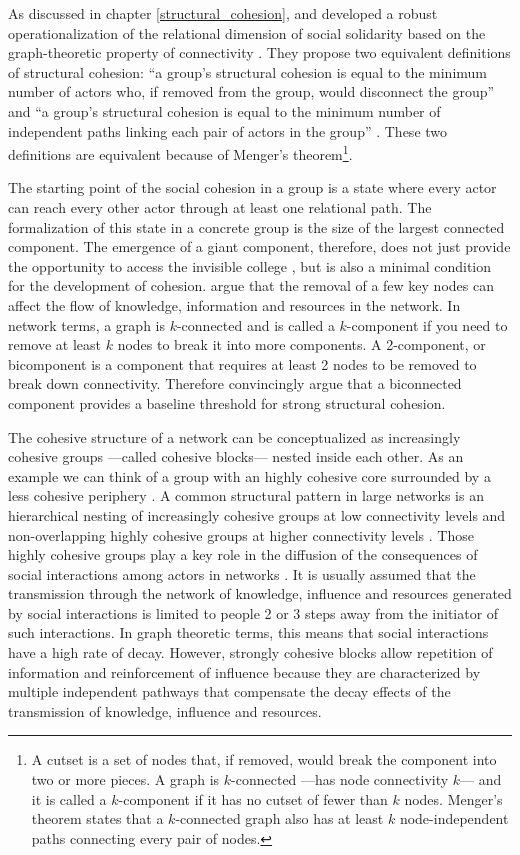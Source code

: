 As discussed in chapter \ref{structural_cohesion}, \citet{white:2001} and \citet{moody:2003} developed a robust operationalization of the relational dimension of social solidarity based on the graph-theoretic property of connectivity \citep{harary:1969}. They propose two equivalent definitions of structural cohesion: ``a group's structural cohesion is equal to the minimum number of actors who, if removed from the group, would disconnect the group'' and ``a group's structural cohesion is equal to the minimum number of independent paths linking each pair of actors in the group'' \citep[109]{moody:2003}. These two definitions are equivalent because of Menger's theorem\footnote{A cutset is a set of nodes that, if removed, would break the component into two or more pieces. A graph is $k$-connected ---has node connectivity $k$--- and it is called a $k$-component if it has no cutset of fewer than $k$ nodes. Menger's theorem states that a $k$-connected graph also has at least $k$ node-independent paths connecting every pair of nodes.}.

The starting point of the social cohesion in a group is a state where every actor can reach every other actor through at least one relational path. The formalization of this state in a concrete group is the size of the largest connected component. The emergence of a giant component, therefore, does not just provide the opportunity to access the invisible college \citep{guimera:2005}, but is also a minimal condition for the development of cohesion. \citet{moody:2003} argue that the removal of a few key nodes can affect the flow of knowledge, information and resources in the network. In network terms, a graph is $k$-connected and is called a $k$-component if you need to remove at least $k$ nodes to break it into more components. A 2-component, or bicomponent is a component that requires at least 2 nodes to be removed to break down connectivity.  Therefore \citet{moody:2003} convincingly argue that a biconnected component provides a baseline threshold for strong structural cohesion.

The cohesive structure of a network can be conceptualized as increasingly cohesive groups ---called cohesive blocks--- nested inside each other. As an example we can think of a group with an highly cohesive core surrounded by a less cohesive periphery \citep{borgatti:2000}. A common structural pattern in large networks is an hierarchical nesting of increasingly cohesive groups at low connectivity levels and non-overlapping highly cohesive groups at higher connectivity levels \citep[112]{moody:2003}. Those highly cohesive groups play a key role in the diffusion of the consequences of social interactions among actors in networks \citep[355-356]{white:2001}. It is usually assumed that the transmission through the network of knowledge, influence and resources generated by social interactions is limited to people 2 or 3 steps away from the initiator of such interactions. In graph theoretic terms, this means that social interactions have a high rate of decay. However, strongly cohesive blocks allow repetition of information and reinforcement of influence because they are characterized by multiple independent pathways that compensate the decay effects of the transmission of knowledge, influence and resources.

